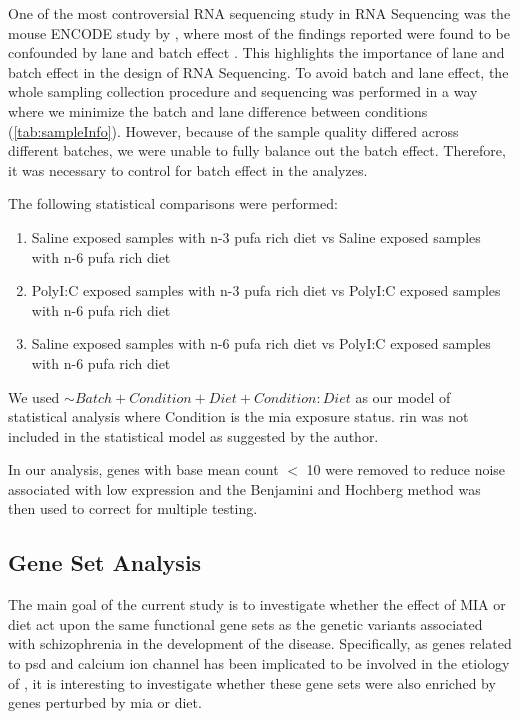 One of the most controversial RNA sequencing study  in RNA Sequencing was the mouse ENCODE study by \citet{Yue2014}, where most of the findings reported were found to be confounded by lane and batch effect \citet{Gilad2015}.
This highlights the importance of lane and batch effect in the design of RNA Sequencing.
To avoid batch and lane effect, the whole sampling collection procedure and sequencing was performed in a way where we minimize the batch and lane difference between conditions (\cref{tab:sampleInfo}). 
However, because of the sample quality differed across different batches, we were unable to fully balance out the batch effect. 
Therefore, it was necessary to control for batch effect in the analyzes.

The following statistical comparisons were performed:
\begin{enumerate}
	\item Saline exposed samples with n-3 \gls{pufa} rich diet vs Saline exposed samples with n-6 \gls{pufa} rich diet 
	\item PolyI:C exposed samples with n-3 \gls{pufa} rich diet vs PolyI:C exposed samples with n-6 \gls{pufa} rich diet 
	\item Saline exposed samples with n-6 \gls{pufa} rich diet vs PolyI:C exposed samples with n-6 \gls{pufa} rich diet 
\end{enumerate}
We used $\sim Batch+Condition+Diet+Condition:Diet$ as our model of statistical analysis where Condition is the \gls{mia} exposure status.
\Gls{rin} was not included in the statistical model as suggested by the author.
%

In our analysis, genes with base mean count $<$ 10 were removed to reduce noise associated with low expression and the Benjamini and Hochberg method was then used to correct for multiple testing.

\subsection{Gene Set Analysis}
\label{sec:function}
The main goal of the current study is to investigate whether the effect of MIA or diet act upon the same functional gene sets as the genetic variants associated with schizophrenia in the development of the disease. 
Specifically, as genes related to \gls{psd} \citep{Purcell2014,Consortium2015a} and calcium ion channel \citep{Purcell2014,Ripke2014,Szatkiewicz2014} has been implicated to be involved in the etiology of , it is interesting to investigate whether these gene sets were also enriched by genes perturbed by \gls{mia} or diet.

